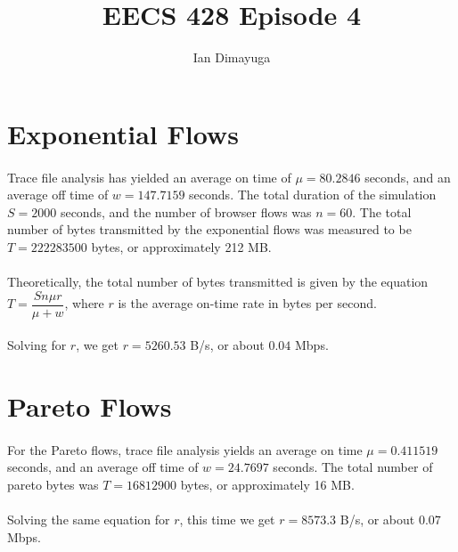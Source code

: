 \documentclass{article}
\begin{document}
\title{EECS 428 Episode 4}
\author{Ian Dimayuga}
\maketitle
\section{Exponential Flows}

\paragraph{}
Trace file analysis has yielded an average on time of $\mu = 80.2846$ seconds, and an average off time of $w = 147.7159$ seconds.
The total duration of the simulation $S = 2000$ seconds, and the number of browser flows was $n = 60$.
The total number of bytes transmitted by the exponential flows was measured to be $T = 222283500$ bytes, or approximately 212 MB.

\paragraph{}
Theoretically, the total number of bytes transmitted is given by the equation $T = \dfrac{S n \mu r}{\mu + w}$, where $r$ is the average on-time rate in bytes per second.

\paragraph{}
Solving for $r$, we get $r = 5260.53$ B/s, or about $0.04$ Mbps.

\section{Pareto Flows}
\paragraph{}
For the Pareto flows, trace file analysis yields an average on time $\mu = 0.411519$ seconds, and an average off time of $w = 24.7697$ seconds.
The total number of pareto bytes was $T = 16812900$ bytes, or approximately 16 MB.

\paragraph{}
Solving the same equation for $r$, this time we get $r = 8573.3$ B/s, or about $0.07$ Mbps.
\end{document}
